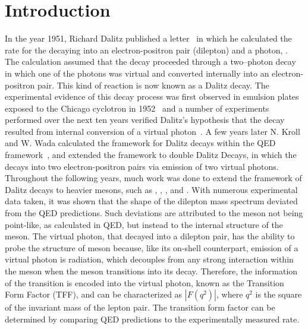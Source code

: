 \section{Introduction}
\indent In the year 1951, Richard Dalitz published a letter~\cite{Dalitz} in which he calculated the rate for the \pizT  decaying into an electron-positron pair (dilepton) and a photon, \pizDal. The calculation assumed that the decay proceeded through a two–photon decay in which one of the photons was virtual and converted internally into an electron-positron pair.  This kind of reaction is now known as a Dalitz decay. The experimental evidence of this decay process was first observed in emulsion plates exposed to the Chicago cyclotron in 1952~\cite{Lord} and a number of experiments performed over the next ten years verified Dalitz’s hypothesis that the \pizDal decay resulted from internal conversion of a virtual photon~\cite{Samios,Lindenfeld,Sargent}. A few years later N. Kroll and W. Wada calculated the framework for Dalitz decays within the QED framework~\cite{KrollWada}, and extended the framework to double Dalitz Decays, in which the \pizT decays into two electron-positron pairs via emission of two virtual photons. Throughout the following years, much work was done to extend the framework of Dalitz decays to heavier mesons, such as \etaT, \omT, \etaTP, and \phiT. With numerous experimental data taken, it was shown that the shape of the dilepton mass spectrum deviated from the QED predictions. Such deviations are attributed to the meson not being point-like, as calculated in QED, but instead to the internal structure of the meson. The virtual photon, that decayed into a dilepton pair, has the ability to probe the structure of meson because, like its on-shell counterpart, emission of a  virtual photon is radiation, which decouples from any strong interaction within the meson when the meson transitions into its decay. Therefore, the information of the transition is encoded into the virtual photon, known as the Transition Form Factor (TFF), and can be characterized as $\left| F(q^2)\right|$, where $q^2$ is the square of the invariant mass of the lepton pair.  The transition form factor can be determined by comparing QED predictions to the experimentally measured rate.
\\
